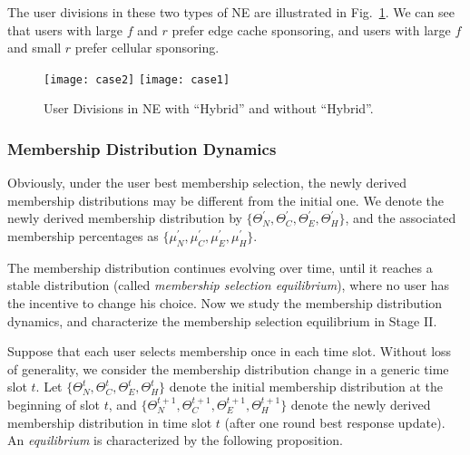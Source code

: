The user divisions in these two types of NE are illustrated in Fig.~\ref{fig:udn}. We can see that users with large $f$ and $r$ prefer edge cache sponsoring, and users with large $f$ and small $r$ prefer cellular sponsoring.


 \begin{figure}[t]
  \centering
     \texttt{[image: case2]}
   \texttt{[image: case1]}

	 \caption{User Divisions in NE with ``Hybrid'' and without ``Hybrid''.}\label{fig:udn}	
\vspace{-4mm}
\end{figure}
 

\subsubsection{Membership Distribution Dynamics}

Obviously, under the user best membership selection, the newly derived membership distributions may be different from the initial one. We denote the newly derived membership distribution by $\{\Theta_N^\prime, \Theta_C^\prime, \Theta_E^\prime, \Theta_H^\prime\}$, and the associated membership percentages as $\{\mu_N^\prime, \mu_C^\prime, \mu_E^\prime, \mu_H^\prime\}$.

The membership distribution continues evolving over time, until it reaches a stable distribution (called \emph{membership selection equilibrium}), where no user has the incentive to change his choice. Now we study the membership distribution dynamics, and characterize the membership selection equilibrium in Stage II.

Suppose that each user selects membership once in each time slot. Without loss of generality,  we consider the membership distribution change in a generic time slot $t$. 
 Let  $\{\Theta_N^t, \Theta_C^t, \Theta_E^t, \Theta_H^t\}$ denote the initial membership distribution at the beginning of slot $t$, and  $\{\Theta_N^{t+1}, \Theta_C^{t+1}, \Theta_E^{t+1}, \Theta_H^{t+1}\}$ denote the  newly derived membership distribution in time slot $t$ (after one round best response update). An \emph{equilibrium} is characterized by the following proposition.

